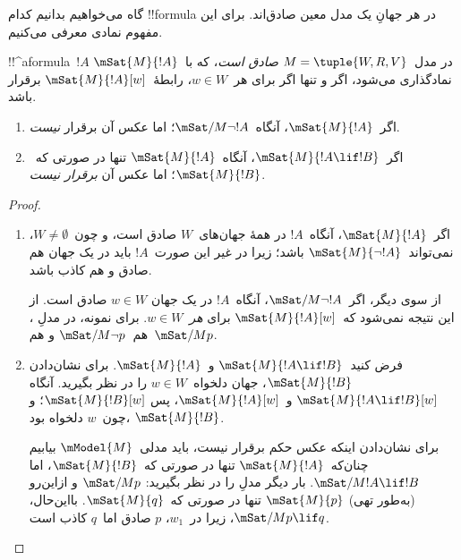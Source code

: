 \documentclass[../../../include/open-logic-section]{subfiles}
\begin{document}


گاه می‌خواهیم بدانیم کدام !!{formula} در هر جهانِ یک مدل معین صادق‌اند.
برای این مفهوم نمادی معرفی می‌کنیم.

\begin{defn}
  !!^a{formula}~$!A$ در مدل~$M = \tuple{W, R, V}$ \emph{صادق است}، که
  با~$\mSat{M}{!A}$ نمادگذاری می‌شود، اگر و تنها اگر برای هر~$w \in W$،
  رابطهٔ~$\mSat{M}{!A}[w]$ برقرار باشد.
\end{defn}

\begin{prop}
  \begin{enumerate}
  \item اگر~$\mSat{M}{!A}$، آنگاه~$\mSat/{M}{\lnot !A}$؛ اما عکس آن
    برقرار \emph{نیست}.
  \item اگر~$\mSat{M}{!A \lif !B}$، آنگاه~$\mSat{M}{!A}$ تنها در صورتی
    که~$\mSat{M}{!B}$؛ اما عکس آن \emph{برقرار نیست}.
  \end{enumerate}
\end{prop}

\begin{proof}
  \begin{enumerate}
  \item اگر~$\mSat{M}{!A}$، آنگاه~$!A$ در همهٔ جهان‌های~$W$ صادق است،
    و چون~$W \neq \emptyset$، نمی‌تواند~$\mSat{M}{\lnot!A}$ باشد؛ زیرا
    در غیر این صورت~$!A$ باید در یک جهان هم صادق و هم کاذب باشد.

    از سوی دیگر، اگر~$\mSat/{M}{\lnot !A}$، آنگاه~$!A$ در یک جهان
    $w \in W$ صادق است. از این نتیجه نمی‌شود که~$\mSat{M}{!A}[w]$ برای
    \emph{هر}~$w \in W$. برای نمونه، در مدلِ
    ، هم~$\mSat/{M}{\lnot p}$ و هم~$\mSat/{M}{p}$.
  \item فرض کنید~$\mSat{M}{!A \lif !B}$ و~$\mSat{M}{!A}$. برای نشان‌دادن
    $\mSat{M}{!B}$، جهان دلخواه~$w \in W$ را در نظر بگیرید. آنگاه
    $\mSat{M}{!A \lif !B}[w]$ و~$\mSat{M}{!A}[w]$، پس
    $\mSat{M}{!B}[w]$؛ و چون~$w$ دلخواه بود، $\mSat{M}{!B}$.

    برای نشان‌دادن اینکه عکس حکم برقرار نیست، باید مدلی~$\mModel{M}$
    بیابیم چنان‌که~$\mSat{M}{!A}$ تنها در صورتی که~$\mSat{M}{!B}$، اما
    $\mSat/{M}{!A \lif !B}$. بار دیگر مدلِ  را
    در نظر بگیرید: $\mSat/{M}{p}$ و ازاین‌رو (به‌طور تهی)
    $\mSat{M}{p}$ تنها در صورتی که~$\mSat{M}{q}$. بااین‌حال،
    $\mSat/{M}{p \lif q}$، زیرا در~$w_1$، $p$ صادق اما~$q$ کاذب است.
  \end{enumerate}
\end{proof}
\end{document}

